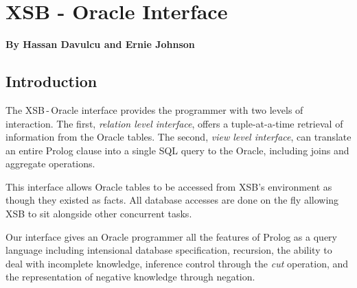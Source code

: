 \chapter{XSB - Oracle Interface} \label{oracle_inter}

\begin{center}
{\Large {\bf By Hassan Davulcu and Ernie Johnson }}
\end{center}

\section{Introduction}

The XSB\,-\,Oracle interface provides the programmer with two levels of
interaction.  The first, {\it relation level interface},
offers a tuple-at-a-time retrieval of information from the Oracle
tables.  The second, {\it view level interface}, can translate an
entire Prolog clause into a single SQL query to the Oracle, including
joins and aggregate operations.

This interface allows Oracle tables to be accessed from XSB's
environment as though they existed as facts. All database accesses are
done on the fly allowing XSB to sit alongside other concurrent tasks.

Our interface gives an Oracle programmer all the features of Prolog as
a query language including intensional database specification,
recursion, the ability to deal with incomplete knowledge, inference
control through the {\it cut} operation, and the representation of
negative knowledge through negation.



